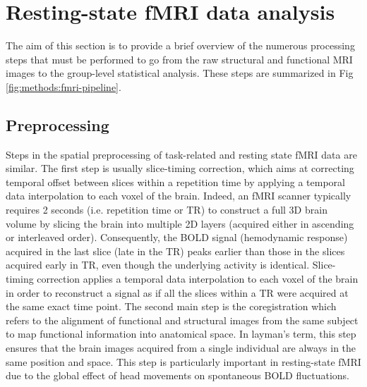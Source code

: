 \section{Resting-state fMRI data analysis}
\label{sec:fmri:rs}

The aim of this section is to provide a brief overview of the numerous processing steps that must be performed to go from the raw structural and functional MRI images to the group-level statistical analysis. These steps are summarized in Fig \ref{fig:methods:fmri-pipeline}.

\subsection{Preprocessing}
\label{sec:fmri:rs:preproc}

Steps in the spatial preprocessing of task-related and resting state fMRI data are similar. The first step is usually slice-timing correction, which aims at correcting temporal offset between slices within a repetition time by applying a temporal data interpolation to each voxel of the brain. Indeed, an fMRI scanner typically requires 2 seconds (i.e. repetition time or TR) to construct a full 3D brain volume by slicing the brain into multiple 2D layers (acquired either in ascending or interleaved order). Consequently, the BOLD signal (hemodynamic response) acquired in the last slice (late in the TR) peaks earlier than those in the slices acquired early in TR, even though the underlying activity is identical. Slice-timing correction applies a temporal data interpolation to each voxel of the brain in order to reconstruct a signal as if all the slices within a TR were acquired at the same exact time point.
The second main step is the coregistration which refers to the alignment of functional and structural images from the same subject to map functional information into anatomical space. In layman’s term, this step ensures that the brain images acquired from a single individual are always in the same position and space. This step is particularly important in resting-state fMRI due to the global effect of head movements on spontaneous BOLD fluctuations.

